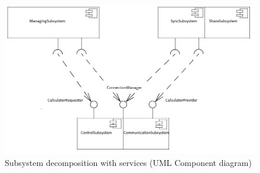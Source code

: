 \begin{figure}[ht!]
\centering
\includegraphics[width=160mm]{UMLComponentService.png}
\caption{Subsystem decomposition with services (UML Component diagram) \label{overflow}}
\end{figure}

